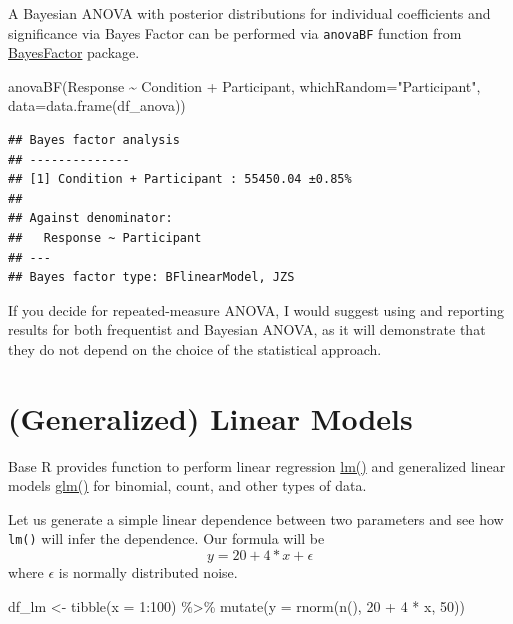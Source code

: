 \documentclass[
]{book}
\newenvironment{Shaded}{\begin{snugshade}}{\end{snugshade}}
\newcommand{\AttributeTok}[1]{\textcolor[rgb]{0.77,0.63,0.00}{#1}}
\newcommand{\DecValTok}[1]{\textcolor[rgb]{0.00,0.00,0.81}{#1}}
\newcommand{\FunctionTok}[1]{\textcolor[rgb]{0.00,0.00,0.00}{#1}}
\newcommand{\NormalTok}[1]{#1}
\newcommand{\OtherTok}[1]{\textcolor[rgb]{0.56,0.35,0.01}{#1}}
\newcommand{\SpecialCharTok}[1]{\textcolor[rgb]{0.00,0.00,0.00}{#1}}
\newcommand{\StringTok}[1]{\textcolor[rgb]{0.31,0.60,0.02}{#1}}
\begin{document}
A Bayesian ANOVA with posterior distributions for individual coefficients and significance via Bayes Factor can be performed
via \texttt{anovaBF} function from \href{https://richarddmorey.github.io/BayesFactor}{BayesFactor} package.

\begin{Shaded}
\begin{Highlighting}[]
\FunctionTok{anovaBF}\NormalTok{(Response }\SpecialCharTok{\textasciitilde{}}\NormalTok{ Condition }\SpecialCharTok{+}\NormalTok{ Participant, }\AttributeTok{whichRandom=}\StringTok{"Participant"}\NormalTok{, }\AttributeTok{data=}\FunctionTok{data.frame}\NormalTok{(df\_anova))}
\end{Highlighting}
\end{Shaded}

\begin{verbatim}
## Bayes factor analysis
## --------------
## [1] Condition + Participant : 55450.04 ±0.85%
## 
## Against denominator:
##   Response ~ Participant 
## ---
## Bayes factor type: BFlinearModel, JZS
\end{verbatim}

If you decide for repeated-measure ANOVA, I would suggest using and reporting results for both frequentist and Bayesian ANOVA, as it will demonstrate that they do not depend on the choice of the statistical approach.

\hypertarget{GLMM}{%
\section{(Generalized) Linear Models}\label{GLMM}}

Base R provides function to perform linear regression \href{https://stat.ethz.ch/R-manual/R-devel/library/stats/html/lm.html}{lm()} and generalized linear models \href{https://stat.ethz.ch/R-manual/R-devel/library/stats/html/glm.html}{glm()} for binomial, count, and other types of data.

Let us generate a simple linear dependence between two parameters and see how \texttt{lm()} will infer the dependence. Our formula will be
\[ y = 20 + 4 * x + \epsilon\]
where \(\epsilon\) is normally distributed noise.

\begin{Shaded}
\begin{Highlighting}[]
\NormalTok{df\_lm }\OtherTok{\textless{}{-}}
  \FunctionTok{tibble}\NormalTok{(}\AttributeTok{x =} \DecValTok{1}\SpecialCharTok{:}\DecValTok{100}\NormalTok{) }\SpecialCharTok{\%\textgreater{}\%}
  \FunctionTok{mutate}\NormalTok{(}\AttributeTok{y =} \FunctionTok{rnorm}\NormalTok{(}\FunctionTok{n}\NormalTok{(), }\DecValTok{20} \SpecialCharTok{+} \DecValTok{4} \SpecialCharTok{*}\NormalTok{ x, }\DecValTok{50}\NormalTok{))}
\end{Highlighting}
\end{Shaded}
\end{document}
